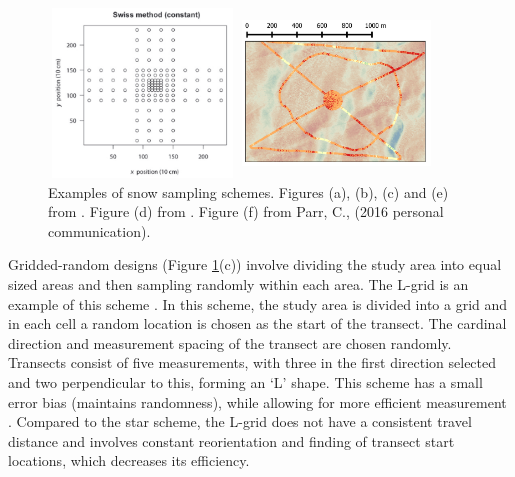 \documentclass{sfuthesis}
\begin{document}
\begin{figure}[t]
\begin{minipage}[c][11cm][t]{.33\textwidth}
\end{minipage}%
\begin{minipage}[c][11cm][t]{.33\textwidth}
        \vspace*{\fill}
  \centering
    \includegraphics[width=5cm,height=4.5cm]{swiss.png}
   \par\vfill
   \includegraphics[width=5cm,height=4.5cm]{hourglass.png}
\end{minipage}
\caption[Examples of snow sampling schemes]{Examples of snow sampling schemes. Figures (a), (b), (c) and (e) from \cite{Shea2010}. Figure (d) from \cite{Schweizer2008}. Figure (f) from Parr, C., (2016 personal communication).}
\label{schemes}
\end{figure}

Gridded-random designs (Figure \ref{schemes}(c)) involve dividing the study area into equal sized areas and then sampling randomly within each area. The L-grid is an example of this scheme \citep{Bellaire2008, Elder2009, Bellaire2011}. In this scheme, the study area is divided into a grid and in each cell a random location is chosen as the start of the transect. The cardinal direction and measurement spacing of the transect are chosen randomly. Transects consist of five measurements, with three in the first direction selected and two perpendicular to this, forming an `L' shape. This scheme has a small error bias (maintains randomness), while allowing for more efficient measurement \citep{Shea2010}. Compared to the star scheme, the L-grid does not have a consistent travel distance and involves constant reorientation and finding of transect start locations, which decreases its efficiency. 
\end{document}
